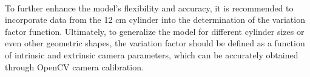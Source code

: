 \paragraph*{}
To further enhance the model's flexibility and accuracy, it is recommended to incorporate data from the 12 cm cylinder into the determination of the variation factor function. Ultimately, to generalize the model for different cylinder sizes or even other geometric shapes, the variation factor should be defined as a function of intrinsic and extrinsic camera parameters, which can be accurately obtained through OpenCV camera calibration.

